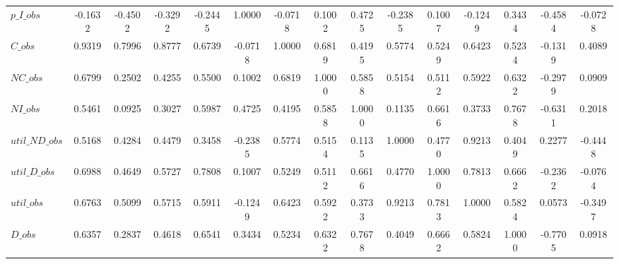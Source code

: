 \begin{center}
\begin{longtable}{lcccccccccccccc}
$p\_I\_obs      $	 & 	          -0.1632	 & 	          -0.4502	 & 	          -0.3292	 & 	          -0.2445	 & 	           1.0000	 & 	          -0.0718	 & 	           0.1002	 & 	           0.4725	 & 	          -0.2385	 & 	           0.1007	 & 	          -0.1249	 & 	           0.3434	 & 	          -0.4584	 & 	          -0.0728 \\ 
$C\_obs         $	 & 	           0.9319	 & 	           0.7996	 & 	           0.8777	 & 	           0.6739	 & 	          -0.0718	 & 	           1.0000	 & 	           0.6819	 & 	           0.4195	 & 	           0.5774	 & 	           0.5249	 & 	           0.6423	 & 	           0.5234	 & 	          -0.1319	 & 	           0.4089 \\ 
$NC\_obs        $	 & 	           0.6799	 & 	           0.2502	 & 	           0.4255	 & 	           0.5500	 & 	           0.1002	 & 	           0.6819	 & 	           1.0000	 & 	           0.5858	 & 	           0.5154	 & 	           0.5112	 & 	           0.5922	 & 	           0.6322	 & 	          -0.2979	 & 	           0.0909 \\ 
$NI\_obs        $	 & 	           0.5461	 & 	           0.0925	 & 	           0.3027	 & 	           0.5987	 & 	           0.4725	 & 	           0.4195	 & 	           0.5858	 & 	           1.0000	 & 	           0.1135	 & 	           0.6616	 & 	           0.3733	 & 	           0.7678	 & 	          -0.6311	 & 	           0.2018 \\ 
$util\_ND\_obs  $	 & 	           0.5168	 & 	           0.4284	 & 	           0.4479	 & 	           0.3458	 & 	          -0.2385	 & 	           0.5774	 & 	           0.5154	 & 	           0.1135	 & 	           1.0000	 & 	           0.4770	 & 	           0.9213	 & 	           0.4049	 & 	           0.2277	 & 	          -0.4448 \\ 
$util\_D\_obs   $	 & 	           0.6988	 & 	           0.4649	 & 	           0.5727	 & 	           0.7808	 & 	           0.1007	 & 	           0.5249	 & 	           0.5112	 & 	           0.6616	 & 	           0.4770	 & 	           1.0000	 & 	           0.7813	 & 	           0.6662	 & 	          -0.2362	 & 	          -0.0764 \\ 
$util\_obs      $	 & 	           0.6763	 & 	           0.5099	 & 	           0.5715	 & 	           0.5911	 & 	          -0.1249	 & 	           0.6423	 & 	           0.5922	 & 	           0.3733	 & 	           0.9213	 & 	           0.7813	 & 	           1.0000	 & 	           0.5824	 & 	           0.0573	 & 	          -0.3497 \\ 
$D\_obs         $	 & 	           0.6357	 & 	           0.2837	 & 	           0.4618	 & 	           0.6541	 & 	           0.3434	 & 	           0.5234	 & 	           0.6322	 & 	           0.7678	 & 	           0.4049	 & 	           0.6662	 & 	           0.5824	 & 	           1.0000	 & 	          -0.7705	 & 	           0.0918 \\ 

\end{longtable}
\end{center}
